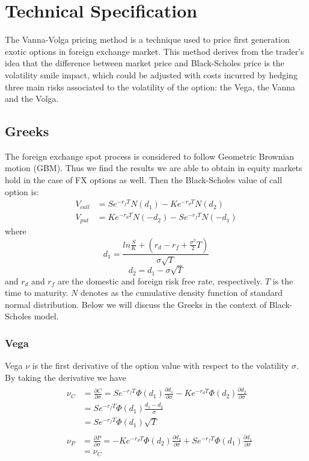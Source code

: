 \chapter{Technical Specification}

The Vanna-Volga pricing method is a technique used to price first generation exotic options in foreign exchange market. This method derives from the trader's idea that the difference between market price and Black-Scholes price is the volatility smile impact, which could be adjusted with costs incurred by hedging three main risks associated to the volatility of the option: the Vega, the Vanna and the Volga.

\section{Greeks} 
The foreign exchange spot process is considered to follow Geometric Brownian motion (GBM). Thus we find the results we are able to obtain in equity markets hold in the case of FX options as well. \newline
Then the Black-Scholes value of call option is:
\begin{align}
V_{call} &= Se^{-r_fT}N(d_1) - Ke^{-r_dT}N(d_2) \\
V_{put} &=  Ke^{-r_dT}N(-d_2) - Se^{-r_fT}N(-d_1)
\end{align}
where 
\[d_1 = \frac{ln\frac{S}{K}+\left( r_d - r_f +\frac{\sigma^2}{2}T\right) }{\sigma\sqrt{T}}\]
\[d_2 = d_1 - \sigma \sqrt{T}\]
and $r_d$ and $r_f$ are the domestic and foreign risk free rate, respectively. $T$ is the time to maturity. $N$ denotes as the cumulative density function of standard normal distribution. Below we will discuss the Greeks in the context of Black-Scholes model.

\subsection{Vega}
Vega $\nu$ is the first derivative of the option value with respect to the volatility $\sigma$. 
\newline
\newline
By taking the derivative we have
\begin{align}
&\begin{aligned}
\nu_C &=\frac{\partial C}{\partial \sigma} = Se^{-r_fT}\varPhi(d_1)\frac{\partial d_1}{\partial \sigma}-Ke^{-r_dT}\varPhi(d_2)\frac{\partial d_2}{\partial \sigma}\\
&= Se^{-r_fT}\varPhi(d_1)\frac{d_1 - d_2}{\sigma} \\
&=  Se^{-r_fT}\varPhi(d_1)\sqrt{T}
\end{aligned} \\
&\begin{aligned}
\nu_P &=\frac{\partial P}{\partial \sigma} =-Ke^{-r_dT}\varPhi(d_2)\frac{\partial d_2}{\partial \sigma} + Se^{-r_fT}\varPhi(d_1)\frac{\partial d_1}{\partial \sigma}\\
&= \nu_C 
\end{aligned}
\end{align}

